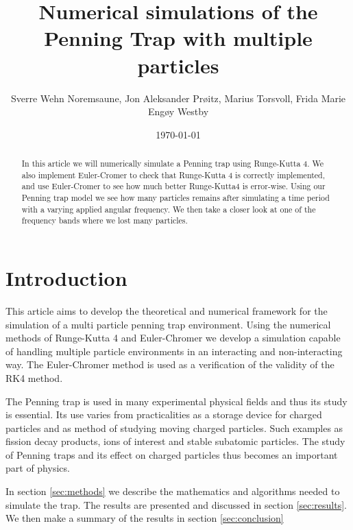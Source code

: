 \documentclass[english,notitlepage,reprint,nofootinbib]{revtex4-1}  %
\begin{document}
	
	\title{Numerical simulations of the Penning Trap with multiple particles}  %
	\author{Sverre Wehn Noremsaune, Jon Aleksander Prøitz, Marius Torsvoll, Frida Marie Engøy Westby} %
	\date{\today}                             %
	\noaffiliation                            %
	
	\begin{abstract}
		In this article we will numerically simulate a Penning trap using Runge-Kutta 4. We also implement Euler-Cromer to check that Runge-Kutta 4 is correctly implemented, and use Euler-Cromer to see how much better Runge-Kutta4 is error-wise. Using our Penning trap model we see how many particles remains after simulating a time period with a varying applied angular frequency. We then take a closer look at one of the frequency bands where we lost many particles.
	\end{abstract}
	\maketitle
	
	
	\section{Introduction}
	This article aims to develop the theoretical and numerical framework for the simulation of a multi particle penning trap environment. Using the numerical methods of Runge-Kutta 4 and Euler-Chromer we develop a simulation capable of handling multiple particle environments in an interacting and non-interacting way. The Euler-Chromer method is used as a verification of the validity of the RK4 method. 
	
	The Penning trap is used in many experimental physical fields and thus its study is essential. Its use varies from practicalities as a storage device for charged particles and as method of studying moving charged particles. Such examples as fission decay products, ions of interest and stable subatomic particles. The study of Penning traps and its effect on charged particles thus becomes an important part of physics. 
	
	In section \ref{sec:methods} we describe the mathematics and algorithms needed to simulate the trap. The results are presented and discussed in section \ref{sec:results}. We then make a summary of the results in section \ref{sec:conclusion}
\end{document}
